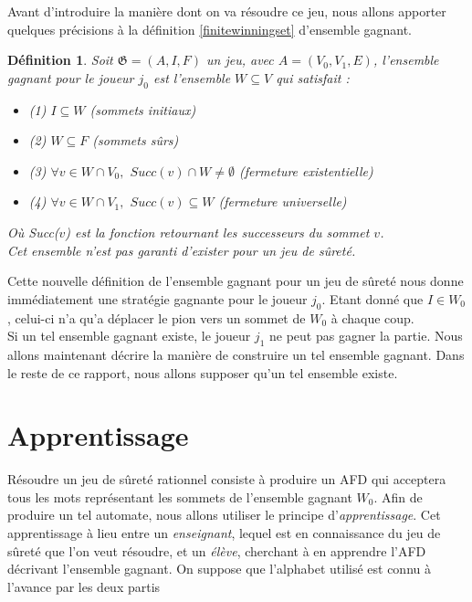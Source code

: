 \documentclass[12pt,a4paper,oneside,titlepage]{report}
\newtheorem{defi}{D\'efinition}[section]
\begin{document}
Avant d'introduire la manière dont on va résoudre ce jeu, nous allons apporter quelques précisions à la définition \ref{finitewinningset} d'ensemble gagnant.
\begin{defi}
\label{infinitewinningset}
Soit $\mathfrak{G}=(A,I,F)$ un jeu, avec $A=(V_0, V_1, E)$, l'\emph{ensemble gagnant} pour le joueur $j_0$ est l'ensemble $W\subseteq V$ qui satisfait :
\begin{itemize}
\item (1) $I\subseteq W$ (\emph{sommets initiaux})
\item (2) $W\subseteq F$ (\emph{sommets sûrs})
\item (3) $\forall v\in W\cap V_0,$ $Succ(v)\cap W\neq\emptyset$ (\emph{fermeture existentielle})
\item (4) $\forall v\in W\cap V_1,$ $Succ(v)\subseteq W$ (\emph{fermeture universelle})
\end{itemize}
Où \emph{Succ($v$)} est la fonction retournant les successeurs du sommet $v$.\\
Cet ensemble n'est pas garanti d'exister pour un jeu de sûreté.
\end{defi}
Cette nouvelle définition de l'ensemble gagnant pour un jeu de sûreté nous donne immédiatement une stratégie gagnante pour le joueur $j_0$. Etant donné que $I\in W_0$, celui-ci n'a qu'a déplacer le pion vers un sommet de $W_0$ à chaque coup.\\
Si un tel ensemble gagnant existe, le joueur $j_1$ ne peut pas gagner la partie. Nous allons maintenant décrire la manière de construire un tel ensemble gagnant. Dans le reste de ce rapport, nous allons supposer qu'un tel ensemble existe.\\


\section{Apprentissage}\label{sectionapprentissage}
Résoudre un jeu de sûreté rationnel consiste à produire un AFD qui acceptera tous les mots représentant les sommets de l'ensemble gagnant $W_0$. Afin de produire un tel automate, nous allons utiliser le principe d'\emph{apprentissage}. Cet apprentissage à lieu entre un \emph{enseignant}, lequel est en connaissance du jeu de sûreté que l'on veut résoudre, et un \emph{élève}, cherchant à en apprendre l'AFD décrivant l'ensemble gagnant. On suppose que l'alphabet utilisé est connu à l'avance par les deux partis\\
\end{document}
